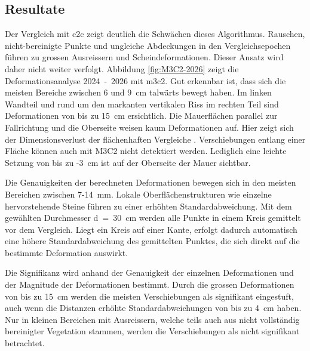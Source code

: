 \subsection{Resultate}
\label{sec:scan-resultate}

Der Vergleich mit \gls{c2c} zeigt deutlich die Schwächen dieses Algorithmus. Rauschen, nicht-bereinigte Punkte und ungleiche 
Abdeckungen in den Vergleichsepochen führen zu grossen Ausreissern und Scheindeformationen. Dieser Ansatz wird daher nicht 
weiter verfolgt.
Abbildung \ref{fig:M3C2-2026} zeigt die Deformationsanalyse 2024~-~2026 mit \gls{m3c2}. Gut erkennbar ist, dass sich die meisten 
Bereiche zwischen 6 und 9~cm talwärts bewegt haben. Im linken Wandteil und rund um den markanten vertikalen Riss im rechten Teil 
sind Deformationen von bis zu 15~cm ersichtlich. Die Mauerflächen parallel zur Fallrichtung und die Oberseite weisen kaum Deformationen 
auf. Hier zeigt sich der Dimensionsverlust der flächenhaften Vergleiche \parencite{rafflEntwicklungZweierMethoden2023}. Verschiebungen entlang einer Fläche können 
auch mit M3C2 nicht detektiert werden. Lediglich eine leichte Setzung von bis zu -3~cm ist auf der Oberseite der Mauer sichtbar.

Die Genauigkeiten der berechneten Deformationen bewegen sich in den meisten Bereichen zwischen 7-14~mm. Lokale Oberflächenstrukturen 
wie einzelne hervorstehende Steine führen zu einer erhöhten Standardabweichung. Mit dem gewählten Durchmesser d~=~30~cm werden alle Punkte 
in einem Kreis gemittelt vor dem Vergleich. Liegt ein Kreis auf einer Kante, erfolgt dadurch automatisch eine höhere Standardabweichung des 
gemittelten Punktes, die sich direkt auf die bestimmte Deformation auswirkt.

Die Signifikanz wird anhand der Genauigkeit der einzelnen Deformationen und der Magnitude der Deformationen bestimmt. Durch die 
grossen Deformationen von bis zu 15~cm werden die meisten Verschiebungen als signifikant eingestuft, auch wenn die Distanzen erhöhte 
Standardabweichungen von bis zu 4~cm haben. Nur in kleinen Bereichen mit Ausreissern, welche teils auch aus nicht vollständig bereinigter 
Vegetation stammen, werden die Verschiebungen als nicht signifikant betrachtet.

